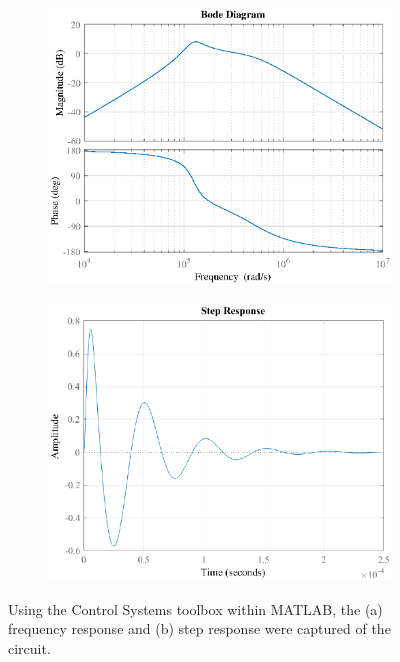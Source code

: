 \documentclass{report}
\begin{document}
\begin{figure}[h]
	\centering
	\begin{subfigure}{0.45\textwidth}
		\centering
		\includegraphics[width=\linewidth]{exp3_matlab_bode}
		\caption{}
	\end{subfigure}
	\begin{subfigure}{0.45\textwidth}
		\centering
		\includegraphics[width=\linewidth]{exp3_matlab_step}
		\caption{}
	\end{subfigure}
	\caption{Using the Control Systems toolbox within MATLAB, the (a) frequency response and (b) step response were captured of the circuit.}
	\label{fig:exp3_matlab}	
\end{figure}
\end{document}

